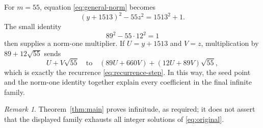 \documentclass[11pt]{article}
\theoremstyle{remark}
\newtheorem*{remark}{Remark}
\begin{document}
For $m=55$, equation \eqref{eq:general-norm} becomes
\[
 (y+1513)^2-55z^2=1513^2+1.
\]
The small identity
\[
 89^2-55\cdot12^2=1
\]
then supplies a norm-one multiplier.  If $U=y+1513$ and $V=z$, multiplication by $89+12\sqrt{55}$ sends
\[
 U+V\sqrt{55}
 \quad\text{to}\quad
 (89U+660V)+(12U+89V)\sqrt{55},
\]
which is exactly the recurrence \eqref{eq:recurrence-step}.  In this way, the seed point and the norm-one identity together explain every coefficient in the final infinite family.

\begin{remark}
Theorem~\ref{thm:main} proves infinitude, as required; it does not assert that the displayed family exhausts all integer solutions of \eqref{eq:original}.
\end{remark}
\end{document}

